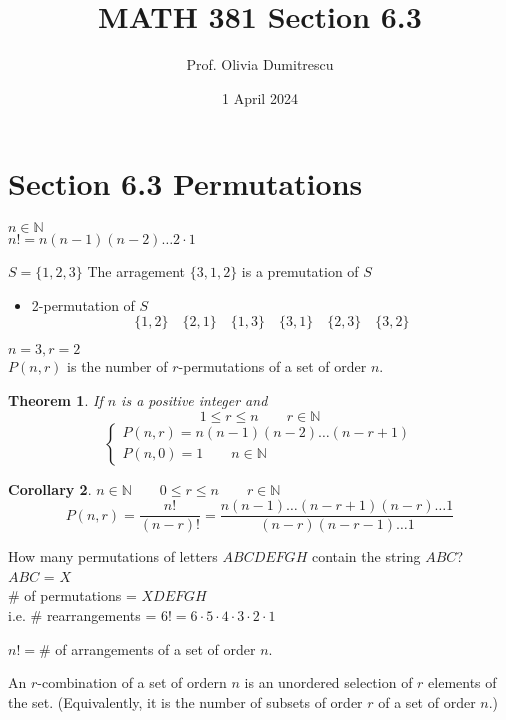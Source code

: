 \documentclass[letterpaper, 12pt]{article}
\title{MATH 381 Section 6.3}
\author{Prof. Olivia Dumitrescu}
\date{1 April 2024}
\newtheorem{theorem}{Theorem}[section]
\newtheorem{corollary}[theorem]{Corollary}
\newenvironment{definition}[1][Definition]{\begin{trivlist}
\item[\hskip \labelsep {\bfseries #1}]}{\end{trivlist}}
\newenvironment{example}[1][Example]{\begin{trivlist}
\item[\hskip \labelsep {\bfseries #1}]}{\end{trivlist}}
\newenvironment{remark}[1][Remark]{\begin{trivlist}
\item[\hskip \labelsep {\bfseries #1}]}{\end{trivlist}}
\newcommand{\N}{\mathbb{N}}
\newcommand{\0}{\emptyset}
\begin{document}
    \maketitle
    \section*{Section 6.3 Permutations}
    $n \in \N$ \\
    $n! = n(n-1)(n-2)\dots2 \cdot 1$
    \begin{example}
        $S = \{1, 2, 3\}$
        The arragement $\{3, 1, 2\}$ is a premutation of $S$
        \begin{itemize}
            \item 2-permutation of $S$
            \[\{1, 2\} \quad \{2, 1\} 
            \quad \{1, 3\} \quad \{3, 1\} 
            \quad \{2, 3\} \quad \{3, 2\}\]
        \end{itemize}
    \end{example}
    $n = 3, r = 2$ \\
    $P(n, r)$ is the number of $r$-permutations of a set of order $n$.
    \begin{theorem}
        If $n$ is a positive integer and 
        \[1 \le r \le n \qquad r \in \N\]
        \[\begin{cases}
            P(n, r) =  n(n-1)(n-2)\dots(n-r +1) \\
            P(n, 0) = 1 \qquad n \in \N
        \end{cases}\]
    \end{theorem}
    \begin{corollary}
        $n \in \N \qquad 0 \le r \le n \qquad r \in \N$
        \[P(n, r) = \frac{n!}{(n-r)!} = \frac{n(n-1)\dots(n-r +1)(n-r)\dots1}{(n-r)(n-r-1)\dots1}\]
    \end{corollary}
    \begin{example}
        How many permutations of letters $ABCDEFGH$ contain the string $ABC$? \\
        $ABC$ = $X$ \\
        \# of permutations = $XDEFGH$ \\
        i.e. \# rearrangements = $6! = 6 \cdot 5 \cdot 4 \cdot 3 \cdot 2 \cdot 1$
    \end{example}
    \begin{remark}
        $n! = \#$ of arrangements of a set of order $n$.
    \end{remark}
    \begin{definition}
        An $r$-combination of a set of ordern $n$ is an unordered selection of $r$ elements of 
        the set. (Equivalently, it is the number of subsets of order $r$ of a set of order $n$.)
    \end{definition}
\end{document}
